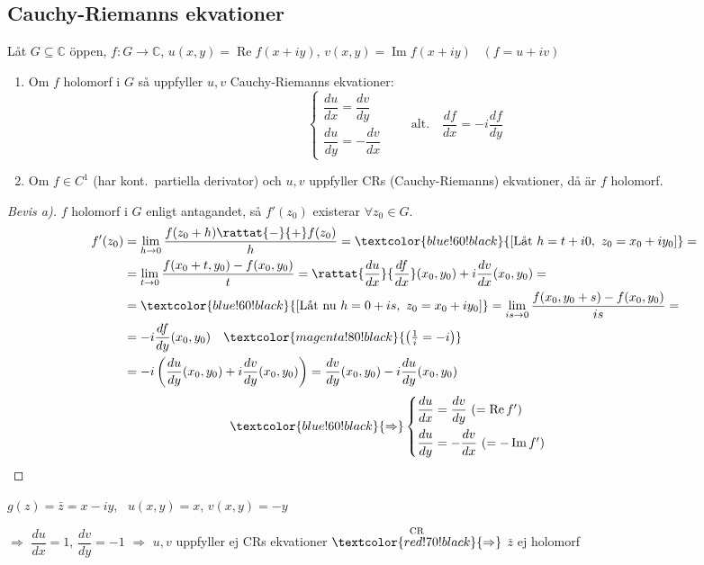\subsection{Cauchy-Riemanns ekvationer}
\begin{theorem}[(2.13)]
Låt $G \subseteq \mathbb{C}$ öppen, $f : G \to \mathbb{C}$, $u(x, y) = \operatorname{Re} f(x + iy)$, $v(x, y) = \operatorname{Im} f(x + iy)$ \ $(f = u + iv)$
\begin{enumerate}[label=\alph*)]
  \item Om $f$ holomorf i $G$ så uppfyller $u, v$ Cauchy-Riemanns ekvationer:
  \[ \begin{cases} \dfrac{du}{dx} = \dfrac{dv}{dy} \\[2ex] \dfrac{du}{dy} = -\dfrac{dv}{dx} \end{cases} \qquad \text{alt.} \quad \frac{df}{dx} = -i \frac{df}{dy} \]
  \item Om $f \in C^1$ (har kont.\ partiella derivator) och $u, v$ uppfyller CRs \textcolor{magenta!80!black}{(Cauchy-Riemanns)} ekvationer, då är $f$ holomorf.
\end{enumerate}
\end{theorem}

\begin{proof}[Bevis a)]
$f$ holomorf i $G$ enligt antagandet, så $f'(z_0)$ existerar $\forall z_0 \in G$.
\begin{align*}
  f'(z_0) &= \lim_{h \to 0} \frac{f(z_0 + h) \rattat{-}{+} f(z_0)}{h} = \textcolor{blue!60!black}{\left[\text{Låt } h = t + i0,\ z_0 = x_0 + iy_0\right]} = \\
  &= \lim_{t \to 0} \frac{f(x_0 + t, y_0) - f(x_0, y_0)}{t} = \rattat{\frac{du}{dx}}{\frac{df}{dx}}(x_0, y_0) + i \frac{dv}{dx}(x_0, y_0) = \\
  &= \textcolor{blue!60!black}{\left[\text{Låt nu } h = 0 + is,\ z_0 = x_0 + iy_0\right]} = \lim_{is \to 0} \frac{f(x_0, y_0 + s) - f(x_0, y_0)}{is} = \\
  &= -i \frac{df}{dy}(x_0, y_0) \quad \textcolor{magenta!80!black}{\left(\tfrac{1}{i} = -i\right)} \\
  &= -i \left( \frac{du}{dy}(x_0, y_0) + i \frac{dv}{dy}(x_0, y_0) \right) = \frac{dv}{dy}(x_0, y_0) - i \frac{du}{dy}(x_0, y_0)
\end{align*}
\[ \textcolor{blue!60!black}{\Rightarrow} \begin{cases} \dfrac{du}{dx} = \dfrac{dv}{dy} \ (= \operatorname{Re} f') \\[2ex] \dfrac{du}{dy} = -\dfrac{dv}{dx} \ (= -\operatorname{Im} f') \end{cases} \]
\end{proof}

\begin{example}
$g(z) = \bar{z} = x - iy$, \ $u(x, y) = x$, $v(x, y) = -y$

\textcolor{red!70!black}{$\Rightarrow$} $\dfrac{du}{dx} = 1$, $\dfrac{dv}{dy} = -1$ \textcolor{red!70!black}{$\Rightarrow$} $u, v$ uppfyller ej CRs ekvationer $\overset{\text{CR}}{\textcolor{red!70!black}{\Rightarrow}}$ $\bar{z}$ ej holomorf
\end{example}
